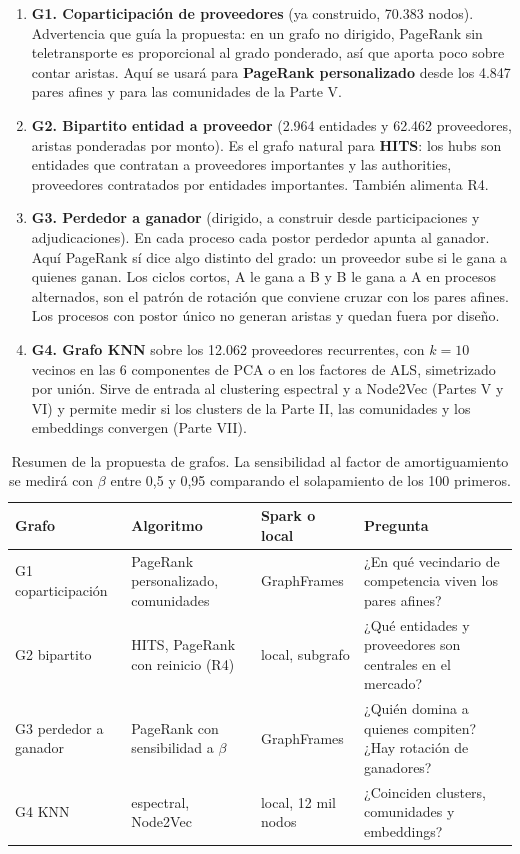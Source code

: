 \documentclass[10pt,a4paper]{article}
\begin{document}
\begin{enumerate}
\item \textbf{G1. Coparticipación de proveedores} (ya construido, 70.383 nodos). Advertencia que guía la propuesta: en un grafo no dirigido, PageRank sin teletransporte es proporcional al grado ponderado, así que aporta poco sobre contar aristas. Aquí se usará para \textbf{PageRank personalizado} desde los 4.847 pares afines y para las comunidades de la Parte V.
\item \textbf{G2. Bipartito entidad a proveedor} (2.964 entidades y 62.462 proveedores, aristas ponderadas por monto). Es el grafo natural para \textbf{HITS}: los hubs son entidades que contratan a proveedores importantes y las authorities, proveedores contratados por entidades importantes. También alimenta R4.
\item \textbf{G3. Perdedor a ganador} (dirigido, a construir desde participaciones y adjudicaciones). En cada proceso cada postor perdedor apunta al ganador. Aquí PageRank sí dice algo distinto del grado: un proveedor sube si le gana a quienes ganan. Los ciclos cortos, A le gana a B y B le gana a A en procesos alternados, son el patrón de rotación que conviene cruzar con los pares afines. Los procesos con postor único no generan aristas y quedan fuera por diseño.
\item \textbf{G4. Grafo KNN} sobre los 12.062 proveedores recurrentes, con $k=10$ vecinos en las 6 componentes de PCA o en los factores de ALS, simetrizado por unión. Sirve de entrada al clustering espectral y a Node2Vec (Partes V y VI) y permite medir si los clusters de la Parte II, las comunidades y los embeddings convergen (Parte VII).
\end{enumerate}

\begin{table}[h]
\centering\small
\begin{tabularx}{\textwidth}{l l l X}
\toprule
Grafo & Algoritmo & Spark o local & Pregunta \\
\midrule
G1 coparticipación & PageRank personalizado, comunidades & GraphFrames & ¿En qué vecindario de competencia viven los pares afines? \\
G2 bipartito & HITS, PageRank con reinicio (R4) & local, subgrafo & ¿Qué entidades y proveedores son centrales en el mercado? \\
G3 perdedor a ganador & PageRank con sensibilidad a $\beta$ & GraphFrames & ¿Quién domina a quienes compiten? ¿Hay rotación de ganadores? \\
G4 KNN & espectral, Node2Vec & local, 12 mil nodos & ¿Coinciden clusters, comunidades y embeddings? \\
\bottomrule
\end{tabularx}
\caption{Resumen de la propuesta de grafos. La sensibilidad al factor de amortiguamiento se medirá con $\beta$ entre 0,5 y 0,95 comparando el solapamiento de los 100 primeros.}
\end{table}
\end{document}

